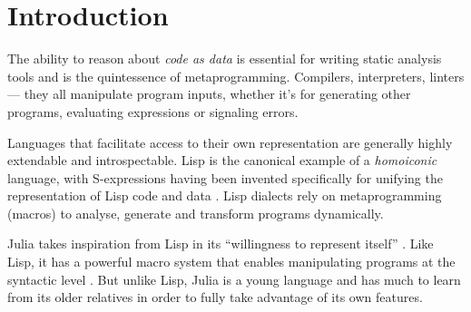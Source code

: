 \documentclass{juliacon}
\begin{document}


\maketitle

\begin{abstract}

In this thesis we present the implementation of a system for matching
syntax and writing static analysis rules in Julia. We begin by
describing Julia's metaprogramming capabilities and comparing them to
syntax manipulation libraries from the Racket ecosystem. We explain
the rationale for porting part of Racket's functionality to
Julia. After understanding the main principles behind the inspiration
libraries, we present our Julia implementation. The defined concepts
and algorithms are illustrated with instructive examples and the
system's flexibility is showcased in a real-world scenario. Finally,
we outline potential extensions and improvements for our
implementation.

\end{abstract}

\section{Introduction}
\label{sec:org3029f3b}

The ability to reason about \emph{code as data} is essential for writing
static analysis tools and is the quintessence of
metaprogramming. Compilers, interpreters, linters — they all
manipulate program inputs, whether it's for generating other programs,
evaluating expressions or signaling errors.

Languages that facilitate access to their own representation are
generally highly extendable and introspectable. Lisp is the canonical
example of a \emph{homoiconic} language, with S-expressions having been
invented specifically for unifying the representation of Lisp code and
data \cite{lisp_paper}. Lisp dialects rely on metaprogramming
(macros) to analyse, generate and transform programs dynamically.

Julia takes inspiration from Lisp in its ``willingness to represent
itself'' \cite{skarpinski_julia_willingness}. Like Lisp, it has a
powerful macro system that enables manipulating programs at the
syntactic level \cite{julia_metaprogramming}. But unlike Lisp, Julia
is a young language \cite{julia_creation} and has much to learn from
its older relatives in order to fully take advantage of its own
features.
\end{document}
